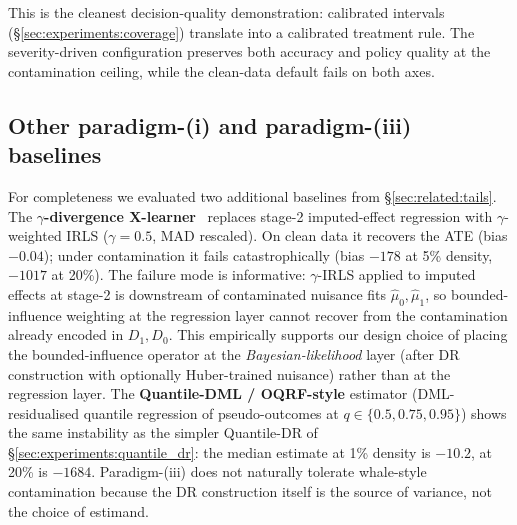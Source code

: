 This is the cleanest decision-quality demonstration: calibrated
intervals (\S\ref{sec:experiments:coverage}) translate into a
calibrated treatment rule. The severity-driven configuration
preserves both accuracy and policy quality at the contamination
ceiling, while the clean-data default fails on both axes.

\subsection{Other paradigm-(i) and paradigm-(iii) baselines}
\label{sec:experiments:other_paradigms}
For completeness we evaluated two additional baselines from
\S\ref{sec:related:tails}.
The \textbf{$\gamma$-divergence X-learner}~\citep[Fujisawa-Eguchi
2008-style;][]{huber2009robust} replaces stage-2 imputed-effect
regression with $\gamma$-weighted IRLS ($\gamma = 0.5$, MAD
rescaled). On clean data it recovers the ATE (bias $-0.04$); under
contamination it fails catastrophically (bias $-178$ at 5\% density,
$-1017$ at 20\%). The failure mode is informative: $\gamma$-IRLS
applied to imputed effects at stage-2 is downstream of contaminated
nuisance fits $\hat\mu_0, \hat\mu_1$, so bounded-influence weighting
at the regression layer cannot recover from the contamination
already encoded in $D_1, D_0$. This empirically supports our design
choice of placing the bounded-influence operator at the
\emph{Bayesian-likelihood} layer (after DR construction with
optionally Huber-trained nuisance) rather than at the regression
layer.
The \textbf{Quantile-DML / OQRF-style} estimator (DML-residualised
quantile regression of pseudo-outcomes at $q \in \{0.5, 0.75,
0.95\}$) shows the same instability as the simpler Quantile-DR of
\S\ref{sec:experiments:quantile_dr}: the median estimate at 1\%
density is $-10.2$, at 20\% is $-1684$. Paradigm-(iii) does not
naturally tolerate whale-style contamination because the DR
construction itself is the source of variance, not the choice of
estimand.
